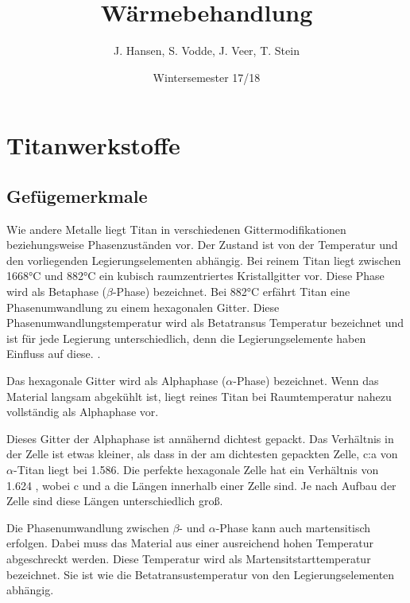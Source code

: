 \documentclass[a4paper, 11pt]{tubsreprt}
\title{Wärmebehandlung}
\date{Wintersemester 17/18}
\author{J. Hansen, S. Vodde,
 J. Veer, T. Stein}
\begin{document}
\maketitle
\tableofcontents
\chapter{Titanwerkstoffe}

\section{Gefügemerkmale}
Wie andere Metalle liegt Titan in verschiedenen Gittermodifikationen beziehungsweise Phasenzuständen vor. Der Zustand ist von der Temperatur und den vorliegenden Legierungselementen abhängig. Bei reinem Titan liegt zwischen 1668°C und 882°C ein kubisch raumzentriertes Kristallgitter vor. Diese Phase wird als Betaphase ($\beta$-Phase) bezeichnet. Bei 882°C erfährt Titan eine Phasenumwandlung zu einem hexagonalen Gitter. Diese Phasenumwandlungstemperatur wird als Betatransus Temperatur bezeichnet und ist für jede Legierung unterschiedlich, denn die Legierungselemente haben Einfluss auf diese. \cite{Luetjering2007}.

Das hexagonale Gitter wird als Alphaphase ($\alpha$-Phase) bezeichnet. Wenn das Material langsam abgekühlt ist, liegt reines Titan bei Raumtemperatur nahezu vollständig als Alphaphase vor. 

Dieses Gitter der Alphaphase ist annähernd dichtest gepackt. Das Verhältnis in der Zelle ist etwas kleiner, als dass in der am dichtesten gepackten Zelle, c:a von $\alpha$-Titan liegt bei 1.586. Die perfekte hexagonale Zelle hat ein Verhältnis von 1.624 \cite{Siemers2017}, wobei c und a die Längen innerhalb einer Zelle sind. Je nach Aufbau der Zelle sind diese Längen unterschiedlich groß.

Die Phasenumwandlung zwischen $\beta$- und $\alpha$-Phase kann auch martensitisch erfolgen. Dabei muss das Material aus einer ausreichend hohen Temperatur abgeschreckt werden. Diese Temperatur wird als Martensitstarttemperatur bezeichnet. Sie ist wie die Betatransustemperatur von den Legierungselementen abhängig.  
\end{document}
